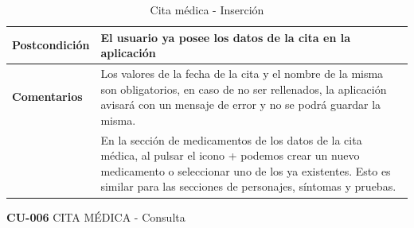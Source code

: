\documentclass[../pfc.tex]{subfiles}
\begin{document}
\begin{table}[H]
\begin{tabular}[t]{|p{3cm}|p{9.5cm}|}
			\hline \textbf{Postcondición} & El usuario ya posee los datos de la cita en la aplicación \\* 
			\hline \textbf{Comentarios}   & Los valores de la fecha de la cita y el nombre de la misma son obligatorios, en caso de no ser rellenados, la aplicación avisará con un mensaje de error y no se podrá guardar la misma.\\*
			& En la sección de medicamentos de los datos de la cita médica, al pulsar el icono + podemos crear un nuevo medicamento o seleccionar uno de los ya existentes. Esto es similar para las secciones de personajes, síntomas y pruebas.\\*
			\hline
		\end{tabular}
		\caption{Cita médica - Inserción}
		\label{tabla:caso005}

	\end{table}

	\clearpage

	\textbf{CU-006}	CITA MÉDICA - Consulta
	
\end{document}
